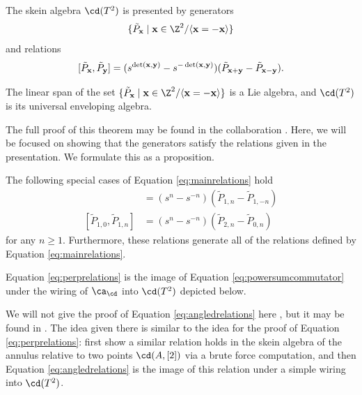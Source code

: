 \begin{theorem}
The skein algebra $\cd(T^2)$ is presented by generators 
\[
\{ \tilde{P}_\xx \mid \xx \in \Z^2 / \langle \xx = - \xx \rangle \}
\]
and relations
\begin{equation} \label{eq:mainrelations}
[\tilde{P}_{\mathbf{x}}, \tilde{P}_{\mathbf{y}}] = (s^{\det({\mathbf{x}}, {\mathbf{y}})} - s^{-\det({\mathbf{x}}, {\mathbf{y}})}) (\tilde{P}_{{\mathbf{x}} + {\mathbf{y}}} - \tilde{P}_{{\mathbf{x}} - {\mathbf{y}}}).
\end{equation}
\end{theorem}

\begin{corollary}
The linear span of the set $\{ \tilde{P}_\xx \mid \xx \in \Z^2 / \langle \xx = - \xx \rangle \}$ is a Lie algebra, and  $\cd(T^2)$ is its universal enveloping algebra. 
\end{corollary}

The full proof of this theorem may be found in the collaboration . Here, we will be focused on showing that the generators satisfy the relations given in the presentation. We formulate this as a proposition.
\begin{proposition}
The following special cases of Equation \eqref{eq:mainrelations} hold
\begin{align}
[\tilde{P}_{1, 0}, \tilde{P}_{0, n}] &= (s^n - s^{-n}) (\tilde{P}_{1, n} - \tilde{P}_{1, -n}) \label{eq:perprelations} \\
[\tilde{P}_{1, 0}, \tilde{P}_{1, n}] &= (s^n - s^{-n}) (\tilde{P}_{2, n} - \tilde{P}_{0, n}) \label{eq:angledrelations}
\end{align}
for any $n \geq 1$. Furthermore, these relations generate all of the relations defined by Equation \eqref{eq:mainrelations}.
\end{proposition}

Equation \eqref{eq:perprelations} is the image of Equation \eqref{eq:powersumcommutator} under the wiring of $\ca_\cd$ into $\cd(T^2)$ depicted below.


We will not give the proof of Equation \eqref{eq:angledrelations} here , but it may be found in . The idea given there is similar to the idea for the proof of Equation \eqref{eq:perprelations}: first show a similar relation holds in the skein algebra of the annulus relative to two points $\cd(A, [2])$ via a brute force computation, and then Equation \eqref{eq:angledrelations} is the image of this relation under a simple wiring into $\cd(T^2)$. 

